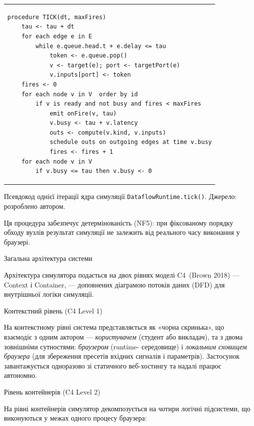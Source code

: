 {\def\LTcaptype{none} %
\begin{longtable}[]{@{}
  >{\raggedright\arraybackslash}p{}@{}}
\toprule\noalign{}
\endhead
\bottomrule\noalign{}
\endlastfoot
\begin{minipage}[t]{\linewidth}\raggedright
\begin{verbatim}
procedure TICK(dt, maxFires)
    tau <- tau + dt
    for each edge e in E
        while e.queue.head.t + e.delay <= tau
            token <- e.queue.pop()
            v <- target(e); port <- targetPort(e)
            v.inputs[port] <- token
    fires <- 0
    for each node v in V  order by id
        if v is ready and not busy and fires < maxFires
            emit onFire(v, tau)
            v.busy <- tau + v.latency
            outs <- compute(v.kind, v.inputs)
            schedule outs on outgoing edges at time v.busy
            fires <- fires + 1
    for each node v in V
        if v.busy <= tau then v.busy <- 0
\end{verbatim}
\end{minipage} \\
\end{longtable}
}

Псевдокод однієї ітерації ядра симуляції
\texttt{DataflowRuntime.tick()}. Джерело: розроблено автором.

Ця процедура забезпечує детермінованість (NF5): при фіксованому порядку
обходу вузлів результат симуляції не залежить від реального часу
виконання у браузері.

\protect{}\label{_Toc228121457}{}Загальна архітектура
системи

Архітектура симулятора подається на двох рівнях моделі C4~(Brown 2018)
--- Context і Container, --- доповнених діаграмою потоків даних (DFD)
для внутрішньої логіки симуляції.

Контекстний рівень (C4 Level 1)

На контекстному рівні система представляється як «чорна скринька», що
взаємодіє з одним актором --- \emph{користувачем} (студент або
викладач), та з двома зовнішніми сутностями: \emph{браузером} (runtime-
середовище) і \emph{локальним сховищем браузера} (для збереження
пресетів вхідних сигналів і параметрів). Застосунок завантажується
одноразово зі статичного веб-хостингу та надалі працює автономно.

Рівень контейнерів (C4 Level 2)

На рівні контейнерів симулятор декомпозується на чотири логічні
підсистеми, що виконуються у межах одного процесу браузера:

